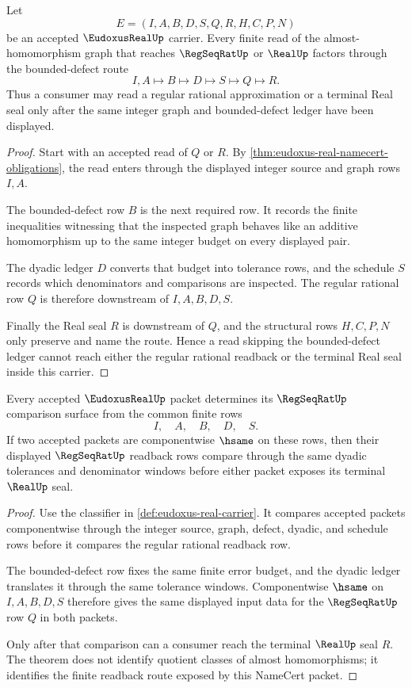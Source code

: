 \begin{theorem}
\label{thm:eudoxus-real-bounded-defect-readback}
Let
$$
E=(I,A,B,D,S,Q,R,H,C,P,N)
$$
be an accepted $\EudoxusRealUp$ carrier. Every finite read of the almost-homomorphism graph that reaches $\RegSeqRatUp$ or $\RealUp$ factors through the bounded-defect route
$$
I,A \longmapsto B \longmapsto D \longmapsto S \longmapsto Q \longmapsto R.
$$
Thus a consumer may read a regular rational approximation or a terminal Real seal only after the same integer graph and bounded-defect ledger have been displayed.
\end{theorem}
\begin{proof}
Start with an accepted read of $Q$ or $R$. By \autoref{thm:eudoxus-real-namecert-obligations}, the read enters through the displayed integer source and graph rows $I,A$.

The bounded-defect row $B$ is the next required row. It records the finite inequalities witnessing that the inspected graph behaves like an additive homomorphism up to the same integer budget on every displayed pair.

The dyadic ledger $D$ converts that budget into tolerance rows, and the schedule $S$ records which denominators and comparisons are inspected. The regular rational row $Q$ is therefore downstream of $I,A,B,D,S$.

Finally the Real seal $R$ is downstream of $Q$, and the structural rows $H,C,P,N$ only preserve and name the route. Hence a read skipping the bounded-defect ledger cannot reach either the regular rational readback or the terminal Real seal inside this carrier.
\end{proof}

\begin{theorem}
\label{thm:eudoxus-real-regseqrat-comparison}
Every accepted $\EudoxusRealUp$ packet determines its $\RegSeqRatUp$ comparison surface from the common finite rows
$$
I,\quad A,\quad B,\quad D,\quad S.
$$
If two accepted packets are componentwise $\hsame$ on these rows, then their displayed $\RegSeqRatUp$ readback rows compare through the same dyadic tolerances and denominator windows before either packet exposes its terminal $\RealUp$ seal.
\end{theorem}
\begin{proof}
Use the classifier in \autoref{def:eudoxus-real-carrier}. It compares accepted packets componentwise through the integer source, graph, defect, dyadic, and schedule rows before it compares the regular rational readback row.

The bounded-defect row fixes the same finite error budget, and the dyadic ledger translates it through the same tolerance windows. Componentwise $\hsame$ on $I,A,B,D,S$ therefore gives the same displayed input data for the $\RegSeqRatUp$ row $Q$ in both packets.

Only after that comparison can a consumer reach the terminal $\RealUp$ seal $R$. The theorem does not identify quotient classes of almost homomorphisms; it identifies the finite readback route exposed by this NameCert packet.
\end{proof}

